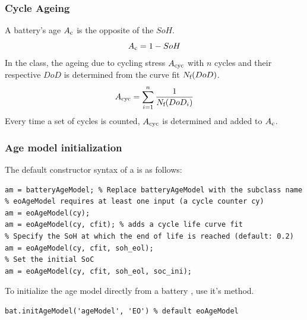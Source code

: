 \subsubsection{Cycle Ageing}
A battery's age $A_\text{c}$ is the opposite of the $SoH$.
\begin{equation}
A_\text{c} = 1 - SoH
\end{equation}
In the  class, the ageing due to cycling stress $A_\text{cyc}$ with $n$ cycles and their respective $DoD$ is determined from the curve fit $N_\text{f}(DoD)$.
\begin{equation}
A_\text{cyc} = \sum_{i=1}^{n}\frac{1}{N_\text{f}(DoD_i)}
\end{equation}
Every time a set of cycles is counted, $A_\text{cyc}$ is determined and added to $A_\text{c}$. 

\subsubsection{Age model initialization}
The default constructor syntax of a  is as follows:
\begin{lstlisting}
am = batteryAgeModel; % Replace batteryAgeModel with the subclass name
% eoAgeModel requires at least one input (a cycle counter cy)
am = eoAgeModel(cy);
am = eoAgeModel(cy, cfit); % adds a cycle life curve fit
% Specify the SoH at which the end of life is reached (default: 0.2)
am = eoAgeModel(cy, cfit, soh_eol);
% Set the initial SoC
am = eoAgeModel(cy, cfit, soh_eol, soc_ini);
\end{lstlisting}
To initialize the age model directly from a battery , use it's  method.
\begin{lstlisting}
bat.initAgeModel('ageModel', 'EO') % default eoAgeModel
\end{lstlisting}

